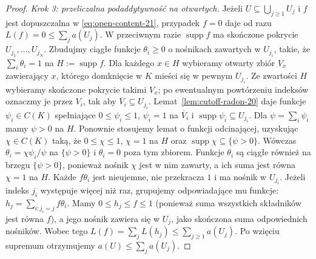 \begin{proof}
\emph{Krok 3: przeliczalna podaddytywność na otwartych.}
Jeżeli $U\subseteq\bigcup_{j\ge1}U_j$ i $f$ jest
dopuszczalna w \eqref{eq:open-content-21}, przypadek
$f=0$ daje od razu $L(f)=0\le\sum_j a(U_j)$.
W przeciwnym razie $\operatorname{supp}f$ ma skończone pokrycie
$U_{j_1},\ldots,U_{j_N}$. Zbudujmy ciągłe funkcje
$\theta_i\ge0$ o nośnikach zawartych w $U_{j_i}$,
takie, że $\sum_i\theta_i=1$ na
$H:=\operatorname{supp}f$. Dla każdego $x\in H$
wybieramy otwarty zbiór $V_x$ zawierający $x$,
którego domknięcie w $K$ mieści się w pewnym $U_{j_i}$.
Ze zwartości $H$ wybieramy skończone pokrycie
takimi $V_x$; po ewentualnym powtórzeniu indeksów
oznaczmy je przez $V_i$, tak aby
$\overline V_i\subseteq U_{j_i}$.
Lemat~\ref{lem:cutoff-radon-20} daje funkcje
$\psi_i\in C(K)$ spełniające
$0\le\psi_i\le1$, $\psi_i=1$ na $\overline V_i$ i
$\operatorname{supp}\psi_i\subseteq U_{j_i}$.
Dla $\psi=\sum_i\psi_i$ mamy $\psi>0$ na $H$.
Ponownie stosujemy lemat o funkcji odcinającej,
uzyskując $\chi\in C(K)$ taką, że $0\le\chi\le1$,
$\chi=1$ na $H$ oraz
$\operatorname{supp}\chi\subseteq\{\psi>0\}$.
Wówczas $\theta_i=\chi\psi_i/\psi$ na $\{\psi>0\}$
i $\theta_i=0$ poza tym zbiorem. Funkcje
$\theta_i$ są ciągłe również na brzegu $\{\psi>0\}$,
ponieważ nośnik $\chi$ jest w nim zawarty,
a ich suma jest równa $\chi=1$ na $H$. Każde $f\theta_i$ jest nieujemne,
nie przekracza $1$ i ma nośnik w $U_{j_i}$.
Jeżeli indeks $j_i$ występuje więcej niż raz, grupujemy odpowiadające mu funkcje: $h_j=\sum_{i:j_i=j}f\theta_i$. Mamy $0\le h_j\le f\le1$ (ponieważ suma wszystkich składników jest równa $f$), a jego nośnik zawiera się w $U_j$, jako skończona suma odpowiednich nośników. Wobec tego
$L(f)=\sum_j L(h_j)\le\sum_{j\ge1}a(U_j)$.
Po wzięciu supremum otrzymujemy
$a(U)\le\sum_j a(U_j)$.


\end{proof}
